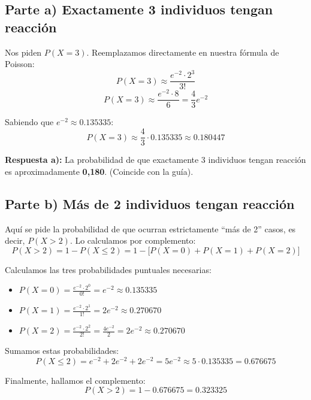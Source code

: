 \documentclass[11pt, a4paper]{article}
\begin{document}
\vspace{0.5cm}

\subsection*{Parte a) Exactamente 3 individuos tengan reacción}

Nos piden $P(X = 3)$. Reemplazamos directamente en nuestra fórmula de Poisson:
\[ P(X = 3) \approx \frac{e^{-2} \cdot 2^3}{3!} \]
\[ P(X = 3) \approx \frac{e^{-2} \cdot 8}{6} = \frac{4}{3} e^{-2} \]

Sabiendo que $e^{-2} \approx 0.135335$:
\[ P(X = 3) \approx \frac{4}{3} \cdot 0.135335 \approx 0.180447 \]

\textbf{Respuesta a):} La probabilidad de que exactamente 3 individuos tengan reacción es aproximadamente \textbf{0,180}. (Coincide con la guía).

\vspace{0.5cm}

\subsection*{Parte b) Más de 2 individuos tengan reacción}

Aquí se pide la probabilidad de que ocurran estrictamente ``más de 2'' casos, es decir, $P(X > 2)$. 
Lo calculamos por complemento:
\[ P(X > 2) = 1 - P(X \le 2) = 1 - \big[ P(X=0) + P(X=1) + P(X=2) \big] \]

Calculamos las tres probabilidades puntuales necesarias:
\begin{itemize}
    \item $P(X=0) = \frac{e^{-2} \cdot 2^0}{0!} = e^{-2} \approx 0.135335$
    \item $P(X=1) = \frac{e^{-2} \cdot 2^1}{1!} = 2e^{-2} \approx 0.270670$
    \item $P(X=2) = \frac{e^{-2} \cdot 2^2}{2!} = \frac{4e^{-2}}{2} = 2e^{-2} \approx 0.270670$
\end{itemize}

Sumamos estas probabilidades:
\[ P(X \le 2) = e^{-2} + 2e^{-2} + 2e^{-2} = 5e^{-2} \approx 5 \cdot 0.135335 = 0.676675 \]

Finalmente, hallamos el complemento:
\[ P(X > 2) = 1 - 0.676675 = 0.323325 \]

\vspace{0.3cm}
\noindent{}
\end{document}

